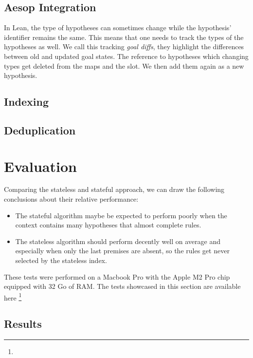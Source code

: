 \documentclass[runningheads]{llncs}
\newcommand{\xcom}[1]{{\color{cyan}{Xavier: #1}} }
\begin{document}
\subsection{Aesop Integration}

\xcom{Incrementality?}
In Lean, the type of hypotheses can sometimes change while the hypothesis' identifier remains the same.
This means that one needs to track the types of the hypotheses as well.
We call this tracking \textit{goal diffs}, they highlight the differences between old and updated goal states.
The reference to hypotheses which changing types get deleted from the maps and the slot.
We then add them again as a new hypothesis.

\subsection{Indexing}

\subsection{Deduplication}

\xcom{precompilation}

\section{Evaluation}%
\label{sec:evaluation}

Comparing the stateless and stateful approach, we can draw the following conclusions about their relative performance:

\begin{itemize}
    \item The stateful algorithm maybe be expected to perform poorly when the context contains many hypotheses that almost complete rules.
    \item The stateless algorithm should perform decently well on average and especially when only the last premises are absent, so the rules get never selected by the stateless index.
\end{itemize}


These tests were performed on a Macbook Pro with the Apple M2 Pro chip equipped with 32 Go of RAM.
The tests showcased in this section are available here \footnote{\xcom{TODO : Link Github repo with tests.}}
\subsection{Results}
\xcom{TODO: Add a comment on the effect it had on Mathlib.}
\end{document}
